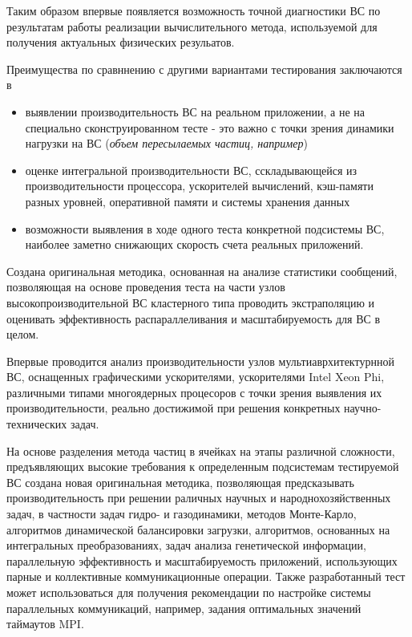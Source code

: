 Таким образом впервые появляется возможность точной диагностики ВС по результатам работы реализации вычислительного метода, используемой для получения актуальных физических резульатов.   

Преимущества по сравннению с другими вариантами тестирования заключаются в
\begin{itemize}
	\item выявлении производительность ВС на реальном приложении, а не на специально сконструированном тесте - это важно с точки зрения динамики нагрузки на ВС (\textit{объем пересылаемых частиц, например})
	
	\item оценке интегральной производительности ВС, сскладывающейся из производительности процессора, ускорителей вычислений, кэш-памяти разных уровней, оперативной памяти и системы хранения данных
	\item возможности выявления в ходе одного теста конкретной подсистемы ВС, наиболее заметно снижающих скорость счета реальных приложений. 
	
\end{itemize}
Создана оригинальная методика, основанная на анализе статистики сообщений, позволяющая на основе проведения теста на части узлов высокопроизводительной ВС кластерного типа проводить экстраполяцию и оценивать эффективность распараллеливания и масштабируемость для ВС в целом.

Впервые проводится анализ производительности узлов мультиаврхитектурнной ВС, оснащенных графическими ускорителями, ускорителями Intel Xeon Phi, различными типами многоядерных процесоров с точки зрения выявления их производительности, реально достижимой при решения конкретных научно-технических задач.

На основе разделения метода частиц в ячейках на этапы различной сложности, предъявляющих высокие требования к определенным подсистемам тестируемой ВС создана новая оригинальная методика, позволяющая предсказывать производительность при решении раличных научных и народнохозяйственных задач, в частности задач гидро- и газодинамики, методов Монте-Карло, алгоритмов динамической балансировки загрузки, алгоритмов, основанных на интегральных преобразованиях, задач анализа генетической информации, параллельную эффективность и масштабируемость приложений, использующих парные и коллективные коммуникационные операции. Также разработанный тест может использоваться для получения рекомендации по настройке системы параллельных коммуникаций, например, задания оптимальных значений таймаутов MPI.


